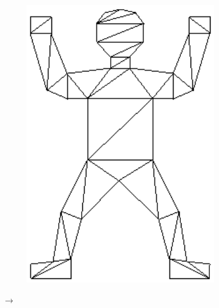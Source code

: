 \documentclass[11pt,a4paper]{extarticle}
\begin{document}
			\begin{figure}[ht]
				\centering
				\begin{subfigure}[ht]{1in}
					\includegraphics[width=0.9\textwidth]{hm1}
					\caption{}
				\end{subfigure}
				\hspace{0.7cm}
				\LARGE{$\longrightarrow$}
				\hspace{0.7cm}
				\begin{subfigure}[ht]{1in}				

\end{subfigure}
\end{figure}
\end{document}
